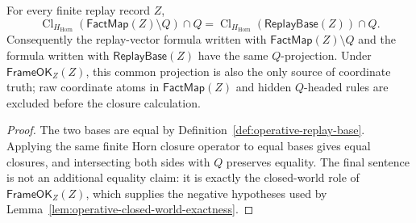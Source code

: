 \documentclass[runningheads]{llncs}
\newcommand{\FactMap}{\mathsf{FactMap}}
\newcommand{\ReplayBase}{\mathsf{ReplayBase}}
\newcommand{\FrameOKZ}{\mathsf{FrameOK}_{Z}}
\newcommand{\HHorn}{H_{\mathrm{Horn}}}
\newcommand{\ClHHorn}{\operatorname{Cl}_{\HHorn}}
\begin{document}
\begin{lemma}
\label{lem:operative-frame-base-equivalence}
For every finite replay record \(Z\),
\[
\ClHHorn
(\FactMap(Z)\setminus Q)\cap Q
=
\ClHHorn(\ReplayBase(Z))\cap Q .
\]
Consequently the replay-vector formula written with
\(\FactMap(Z)\setminus Q\) and the formula written with
\(\ReplayBase(Z)\) have the same \(Q\)-projection.  Under
\(\FrameOKZ(Z)\), this common projection is also the only source of coordinate
truth; raw coordinate atoms in \(\FactMap(Z)\) and hidden \(Q\)-headed rules are
excluded before the closure calculation.
\end{lemma}

\begin{proof}
The two bases are equal by Definition~\ref{def:operative-replay-base}.  Applying
the same finite Horn closure operator to equal bases gives equal closures, and
intersecting both sides with \(Q\) preserves equality.  The final sentence is
not an additional equality claim: it is exactly the closed-world role of
\(\FrameOKZ(Z)\), which supplies the negative hypotheses used by
Lemma~\ref{lem:operative-closed-world-exactness}.
\end{proof}
\end{document}
